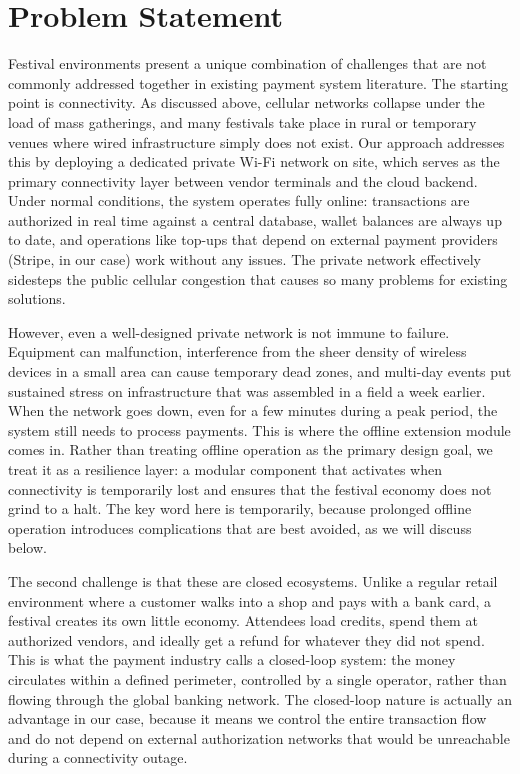 \section{Problem Statement}
\label{sec:problem-statement}

Festival environments present a unique combination of challenges that are not commonly addressed together in existing payment system literature. The starting point is connectivity. As discussed above, cellular networks collapse under the load of mass gatherings, and many festivals take place in rural or temporary venues where wired infrastructure simply does not exist. Our approach addresses this by deploying a dedicated private Wi-Fi network on site, which serves as the primary connectivity layer between vendor terminals and the cloud backend. Under normal conditions, the system operates fully online: transactions are authorized in real time against a central database, wallet balances are always up to date, and operations like top-ups that depend on external payment providers (Stripe, in our case) work without any issues. The private network effectively sidesteps the public cellular congestion that causes so many problems for existing solutions.

However, even a well-designed private network is not immune to failure. Equipment can malfunction, interference from the sheer density of wireless devices in a small area can cause temporary dead zones, and multi-day events put sustained stress on infrastructure that was assembled in a field a week earlier. When the network goes down, even for a few minutes during a peak period, the system still needs to process payments. This is where the offline extension module comes in. Rather than treating offline operation as the primary design goal, we treat it as a resilience layer: a modular component that activates when connectivity is temporarily lost and ensures that the festival economy does not grind to a halt. The key word here is temporarily, because prolonged offline operation introduces complications that are best avoided, as we will discuss below.

The second challenge is that these are closed ecosystems. Unlike a regular retail environment where a customer walks into a shop and pays with a bank card, a festival creates its own little economy. Attendees load credits, spend them at authorized vendors, and ideally get a refund for whatever they did not spend. This is what the payment industry calls a closed-loop system: the money circulates within a defined perimeter, controlled by a single operator, rather than flowing through the global banking network. The closed-loop nature is actually an advantage in our case, because it means we control the entire transaction flow and do not depend on external authorization networks that would be unreachable during a connectivity outage.

